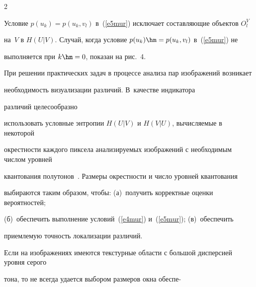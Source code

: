 \begin{multicols}{2}
  


  Условие $p(u_k) =p(u_k,v_l)$ в~(\ref{e5mur}) исключает со\-став\-ля\-ющие объектов $O_l^V$ 


на~$V$ в $H(U\vert V)$. Случай, когда условие $p(u_k)\hm=p(u_k,v_l)$ в~(\ref{e5mur}) не 


выполняется при $k\hm = 0$, показан на рис.~4.


  


  При решении практических задач в процессе анализа пар изображений возникает 


необходимость визуализации различий. В~качестве индикатора\linebreak


 различий целесообразно 


использовать условные энтропии $H(U\vert V)$ и $H(V\vert U)$, вычисляемые в некоторой 


окрестности каждого пиксела ана\-ли\-зи\-ру\-емых изображений с необходимым числом уровней 


квантования полутонов~\cite{15mur}. Размеры окрестности и число уровней квантования 


выбираются таким образом, чтобы: (а)~получить корректные оценки вероятностей; 


(б)~обеспечить выполнение условий~(\ref{e4mur}) и~(\ref{e5mur}); (в)~обеспечить 


приемлемую точность локализации различий.











  


  Если на изображениях имеются текстурные об\-ласти с большой дисперсией уровня серого 


тона, то не всегда удается выбором размеров окна обеспе-\linebreak\vspace*{-12pt}


\pagebreak





\end{multicols}





